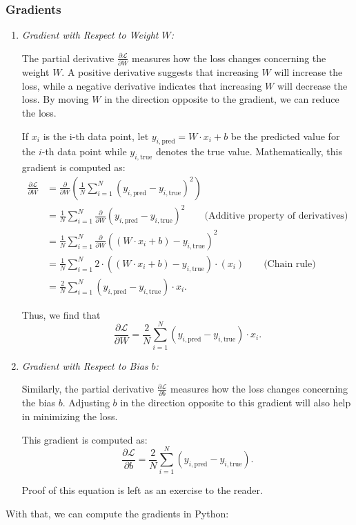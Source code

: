 \subsubsection{Gradients}
\begin{enumerate}
    \item \textit{Gradient with Respect to Weight $W$:}

    The partial derivative $\frac{\partial \mathcal{L}}{\partial W}$ measures how the loss changes concerning the weight $W$. A positive derivative suggests that increasing $W$ will increase the loss, while a negative derivative indicates that increasing $W$ will decrease the loss. By moving $W$ in the direction opposite to the gradient, we can reduce the loss.

    If $x_i$ is the i-th data point, let $y_{i,\text{pred}} = W \cdot x_i + b$ be the predicted value for the $i$-th data point while $y_{i,\text{true}}$ denotes the true value. Mathematically, this gradient is computed as:
    \begin{align*}
        \frac{\partial \mathcal{L}}{\partial W} &= \frac{\partial}{\partial W}\left( \frac{1}{N}\sum_{i=1}^N(y_{i,\text{pred}} - y_{i,\text{true}})^2\right) \nonumber \\
        & = \frac{1}{N}\sum_{i=1}^N\frac{\partial}{\partial W}(y_{i,\text{pred}} - y_{i,\text{true}})^2 \qquad \text{(Additive property of derivatives)} \nonumber \\
        & = \frac{1}{N}\sum_{i=1}^N\frac{\partial}{\partial W}((W\cdot x_i + b) - y_{i,\text{true}})^2 \nonumber \\
        & = \frac{1}{N}\sum_{i=1}^N 2\cdot((W\cdot x_i + b) - y_{i,\text{true}})\cdot (x_i) \qquad \text{(Chain rule)} \nonumber \\
        & = \frac{2}{N}\sum_{i=1}^N(y_{i,\text{pred}} - y_{i,\text{true}})\cdot x_i.
    \end{align*}

    Thus, we find that 
    \begin{equation}
        \frac{\partial \mathcal{L}}{\partial W} = \frac{2}{N}\sum_{i=1}^N(y_{i,\text{pred}} - y_{i,\text{true}})\cdot x_i.
        \label{eq:gradient_w}
    \end{equation}
    
    \item \textit{Gradient with Respect to Bias $ b $:}

    Similarly, the partial derivative $\frac{\partial \mathcal{L}}{\partial b}$ measures how the loss changes concerning the bias $b$. Adjusting $b$ in the direction opposite to this gradient will also help in minimizing the loss.

    This gradient is computed as:
    \begin{equation}
        \frac{\partial \mathcal{L}}{\partial b} = \frac{2}{N}\sum_{i=1}^N(y_{i,\text{pred}} - y_{i,\text{true}}).
        \label{eq:gradient_b}
    \end{equation}

    Proof of this equation is left as an exercise to the reader.
\end{enumerate}
\pagebreak
With that, we can compute the gradients in Python:

